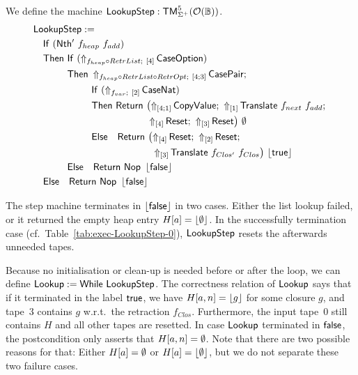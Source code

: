 \begin{definition}
  \label{def:Lookup_Step}
  We define the machine $\mathsf{LookupStep} : \mathsf{TM}_{\Sigma^+}^5(\mathcal{O}(\mathbb{B}))$.
  \begin{align*}
    & \MS{LookupStep} := \\
    & \quad \MS{If}~(\MS{Nth'}~f_{heap}~f_{add}) \\
    & \quad \MS{Then}~\MS{If}~(\LiftBoth{\MS{CaseOption}}{f_{heap} \circ RetrList}{\Vector{4}}) \\
    & \quad \phantom{\MS{Then}}~\MS{Then}~\LiftBoth{\MS{CasePair}}{f_{heap} \circ RetrList \circ RetrOpt}{\Vector{4;3}} \Seq \\
    & \quad \phantom{\MS{Then}~\MS{Then}}~\MS{If}~(\LiftBoth{\MS{CaseNat}}{f_{var}}{\Vector{2}}) \\
    & \quad \phantom{\MS{Then}~\MS{Then}}~\MS{Then}~ \MS{Return}~\bigl(
      \LiftTapes{\MS{CopyValue}}{\Vector{4;1}} \Seq
      \LiftTapes{\MS{Translate}~f_{next}~f_{add}}{\Vector{1}} \Seq \\
    & \quad \phantom{\MS{Then}~\MS{Then}~\MS{Then}~\MS{Return}\bigl(}
      \LiftTapes{\MS{Reset}}{\Vector{4}} \Seq
      \LiftTapes{\MS{Reset}}{\Vector{3}}
      \bigr)~{\None} \\
    & \quad \phantom{\MS{Then}~\MS{Then}}~\MS{Else}~~~ \MS{Return}~\bigl(
      \LiftTapes{\MS{Reset}}{\Vector{4}} \Seq
      \LiftTapes{\MS{Reset}}{\Vector{2}} \Seq \\
    & \quad \phantom{\phantom{\MS{Then}~\MS{Then}}~\MS{Else}~~~\MS{Return}~\bigl(}
      \LiftTapes{\MS{Translate}~f_{Clos'}~f_{Clos}}{\Vector{3}}
      \bigr)~{\Some\true} \\
    & \quad \phantom{\MS{Then}}~\MS{Else}~~~ \Return{\Nop}{\Some\false} \\
    & \quad \MS{Else}~~~ \Return{\Nop}{\Some\false}
  \end{align*}
\end{definition}

The step machine terminates in $\left\lfloor {\ensuremath{\mathsf{false}}} \right\rfloor$ in two cases.  Either the list lookup failed, or it returned the empty heap entry $H[a]=\left\lfloor {\emptyset} \right\rfloor$.  In
the successfully termination case (cf.\ Table~\ref{tab:exec-LookupStep-0}), $\mathsf{LookupStep}$ resets the afterwards unneeded tapes.

Because no initialisation or clean-up is needed before or after the loop, we can define $\mathsf{Lookup} := \mathsf{While}~\mathsf{LookupStep}$.  The correctness
relation of $\mathsf{Lookup}$ says that if it terminated in the label $\mathsf{true}$, we have $H[a,n] = \left\lfloor {g} \right\rfloor$ for some closure $g$, and tape~$3$ contains $g$
w.r.t.\ the retraction $f_{Clos}$.  Furthermore, the input tape~$0$ still contains $H$ and all other tapes are resetted.  In case $\mathsf{Lookup}$
terminated in $\mathsf{false}$, the postcondition only asserts that $H[a,n]=\emptyset$.  Note that there are two possible reasons for that: Either $H[a]=\emptyset$ or
$H[a]=\left\lfloor {\emptyset} \right\rfloor$, but we do not separate these two failure cases.


